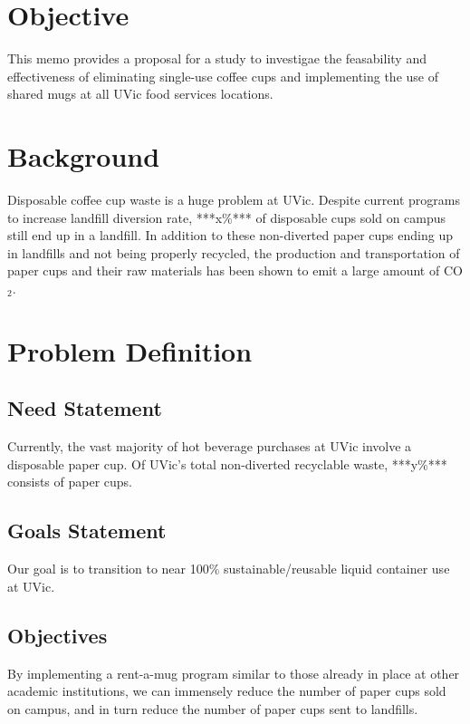 \documentclass[letterpaper,11pt]{texMemo}
\begin{document}
\maketitle

\section*{Objective}
This memo provides a proposal for a study to investigae the feasability and
effectiveness of eliminating single-use coffee cups and implementing the
use of shared mugs at all UVic food services
locations.
\section*{Background}
Disposable coffee cup waste is a huge problem at UVic. Despite current programs
to increase landfill diversion rate, ***x\%*** of disposable cups sold on campus
still end up in a landfill.\cite{myrefitem} In addition to these non-diverted
paper cups ending up in landfills and not being properly recycled, the
production and transportation of paper cups and their raw materials has been
shown to emit a large amount of CO$_{2}$.\cite{papercupemissions}
\section*{Problem Definition}
\subsection*{Need Statement}
Currently, the vast majority of hot beverage purchases at UVic involve a
disposable paper cup.%
Of UVic's total non-diverted recyclable waste, ***y\%*** consists of paper
cups.%
\subsection*{Goals Statement}
Our goal is to transition to near 100\% sustainable/reusable liquid container
use at UVic.
\subsection*{Objectives}
By implementing a rent-a-mug program similar to those already in place at
other academic institutions,%
we can immensely reduce the number of paper cups sold on campus, and in
turn reduce the number of paper cups sent to landfills.
\end{document}
